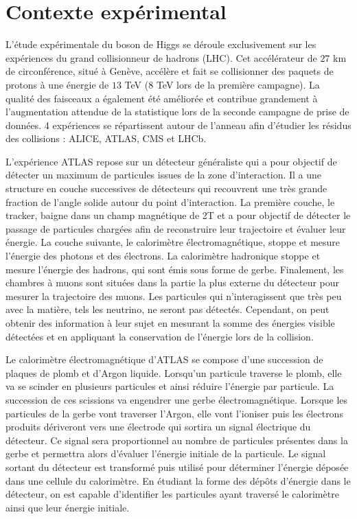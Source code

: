 \section{Contexte expérimental}

L'étude expérimentale du boson de Higgs se déroule exclusivement sur les expériences du grand collisionneur de hadrons (LHC).
Cet accélérateur de $27$ km de circonférence, situé à Genève, accélère et fait se collisionner des paquets de protons à une énergie de $13$ TeV ($8$ TeV lors de la première campagne).
La qualité des faisceaux a également été améliorée et contribue grandement à l'augmentation attendue de la statistique lors de la seconde campagne de prise de données.
4 expériences se répartissent autour de l'anneau afin d'étudier les résidus des collisions : ALICE, ATLAS, CMS et LHCb.

L'expérience ATLAS repose sur un détecteur généraliste qui a pour objectif de détecter un maximum de particules issues de la zone d'interaction.
Il a une structure en couche successives de détecteurs qui recouvrent une très grande fraction de l'angle solide autour du point d'interaction.
La première couche, le tracker, baigne dans un champ magnétique de 2T et a pour objectif de détecter le passage de particules chargées afin de reconstruire leur trajectoire et évaluer leur énergie.
La couche suivante, le calorimètre électromagnétique, stoppe et mesure l'énergie des photons et des électrons.
La calorimètre hadronique stoppe et mesure l'énergie des hadrons, qui sont émis sous forme de gerbe.
Finalement, les chambres à muons sont situées dans la partie la plus externe du détecteur pour mesurer la trajectoire des muons.
Les particules qui n'interagissent que très peu avec la matière, tels les neutrino, ne seront pas détectés.
Cependant, on peut obtenir des information à leur sujet en mesurant la somme des énergies visible détectées et en appliquant la conservation de l'énergie lors de la collision.

Le calorimètre électromagnétique d'ATLAS se compose d'une succession de plaques de plomb et d'Argon liquide.
Lorsqu'un particule traverse le plomb, elle va se scinder en plusieurs particules et ainsi réduire l'énergie par particule.
La succession de ces scissions va engendrer une gerbe électromagnétique.
Lorsque les particules de la gerbe vont traverser l'Argon, elle vont l'ioniser puis les électrons produits dériveront vers une électrode qui sortira un signal électrique du détecteur.
Ce signal sera proportionnel au nombre de particules présentes dans la gerbe et permettra alors d'évaluer l'énergie initiale de la particule.
Le signal sortant du détecteur est transformé puis utilisé pour déterminer l'énergie déposée dans une cellule du calorimètre.
En étudiant la forme des dépôts d'énergie dans le détecteur, on est capable d'identifier les particules ayant traversé le calorimètre ainsi que leur énergie initiale.

